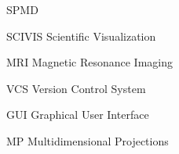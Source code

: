 \documentclass[cic,tc,english]{iiufrgs}
\begin{document}
\listoffigures

\listoftables

\begin{listofabbrv}{SPMD}
    \item[SCIVIS] Scientific Visualization
    \item[MRI] Magnetic Resonance Imaging
    \item[VCS] Version Control System
    \item[GUI] Graphical User Interface
    \item[MP] Multidimensional Projections
\end{listofabbrv}


\tableofcontents









  
  
  
  
  
  
  





%



\end{document}
